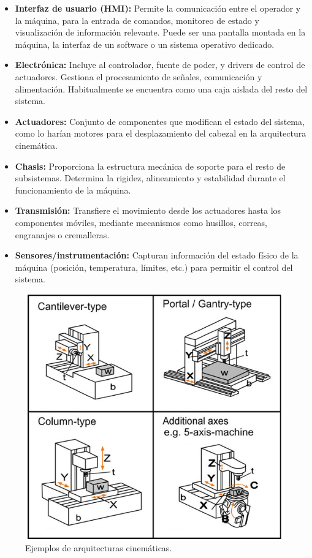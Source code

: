 \begin{itemize}
    \item \textbf{Interfaz de usuario (HMI):} Permite la comunicación entre el operador y la máquina, para la entrada de comandos, monitoreo de estado y visualización de información relevante. Puede ser una pantalla montada en la máquina, la interfaz de un software o un sistema operativo dedicado.

    \item \textbf{Electrónica:} Incluye al controlador, fuente de poder, y drivers de control de actuadores. Gestiona el procesamiento de señales, comunicación y alimentación. Habitualmente se encuentra como una caja aislada del resto del sistema.

    \item \textbf{Actuadores:} Conjunto de componentes que modifican el estado del sistema, como lo harían motores para el desplazamiento del cabezal en la arquitectura cinemática.

    \item \textbf{Chasis:} Proporciona la estructura mecánica de soporte para el resto de subsistemas. Determina la rigidez, alineamiento y estabilidad durante el funcionamiento de la máquina.

    \item \textbf{Transmisión:} Transfiere el movimiento desde los actuadores hasta los componentes móviles, mediante mecanismos como husillos, correas, engranajes o cremalleras.

    \item \textbf{Sensores/instrumentación:} Capturan información del estado físico de la máquina (posición, temperatura, límites, etc.) para permitir el control del sistema.
\end{itemize}

\begin{figure}[h!]
    \centering
    \includegraphics[width=0.67\linewidth]{imgs/kins.png}
    \caption{Ejemplos de arquitecturas cinemáticas.}
    \label{kinsfig}
\end{figure}

